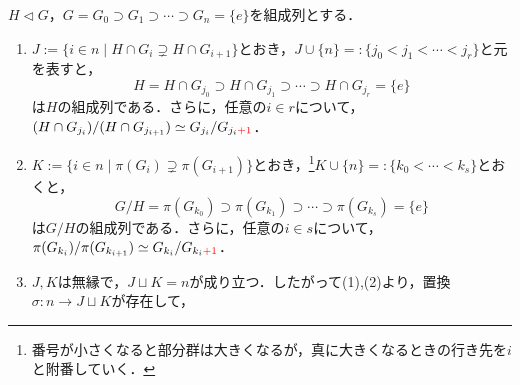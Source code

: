 \documentclass[uplatex,dvipdfmx]{jsreport}
\begin{document}
\begin{lemma}\label{lemma-decomposition-of-composition-series-along-exact-sequence}
    $H\triangleleft G$，$G=G_0\supset G_1\supset\cdots\supset G_n=\{e\}$を組成列とする．
    \begin{enumerate}
        \item $J:=\{i\in n\mid H\cap G_i\supsetneq H\cap G_{i+1}\}$とおき，$J\cup\{n\}=:\{j_0<j_1<\cdots<j_r\}$と元を表すと，
        \[H=H\cap G_{j_0}\supset H\cap G_{j_1}\supset\cdots\supset H\cap G_{j_r}=\{e\}\]
        は$H$の組成列である．さらに，任意の$i\in r$について，$(H\cap G_{j_i})/(H\cap G_{j_{i+1}})\simeq G_{j_i}/G_{j_{i}\textcolor{red}{+1}}$．
        \item $K:=\{i\in n\mid \pi(G_i)\supsetneq\pi(G_{i+1})\}$とおき，\footnote{番号が小さくなると部分群は大きくなるが，真に大きくなるときの行き先を$i$と附番していく．}$K\cup\{n\}=:\{k_0<\cdots<k_s\}$とおくと，
        \[G/H=\pi(G_{k_0})\supset\pi(G_{k_1})\supset\cdots\supset\pi(G_{k_s})=\{e\}\]
        は$G/H$の組成列である．さらに，任意の$i\in s$について，$\pi(G_{k_i})/\pi(G_{k_{i+1}})\simeq G_{k_i}/G_{k_i\textcolor{red}{+1}}$．
        \item $J,K$は無縁で，$J\sqcup K=n$が成り立つ．したがって(1),(2)より，置換$\sigma:n\to J\sqcup K$が存在して，
    \end{enumerate}
\end{lemma}
\end{document}
